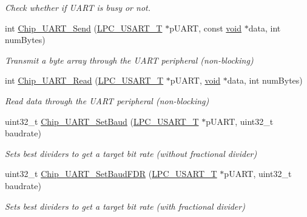 \begin{DoxyCompactItemize}
\begin{DoxyCompactList}\small\item\em Check whether if U\-A\-R\-T is busy or not. \end{DoxyCompactList}\item 
int \hyperlink{group__UART__17XX__40XX_gacbd726b1450510892272857e43854c4c}{Chip\-\_\-\-U\-A\-R\-T\-\_\-\-Send} (\hyperlink{structLPC__USART__T}{L\-P\-C\-\_\-\-U\-S\-A\-R\-T\-\_\-\-T} $\ast$p\-U\-A\-R\-T, const \hyperlink{Paradigm_2Tern__EE_2small_2portmacro_8h_a14d32f8130d3c0b212cfc751730b5b49}{void} $\ast$data, int num\-Bytes)
\begin{DoxyCompactList}\small\item\em Transmit a byte array through the U\-A\-R\-T peripheral (non-\/blocking) \end{DoxyCompactList}\item 
int \hyperlink{group__UART__17XX__40XX_ga06dd61ee7d8483847fea746978cb1c93}{Chip\-\_\-\-U\-A\-R\-T\-\_\-\-Read} (\hyperlink{structLPC__USART__T}{L\-P\-C\-\_\-\-U\-S\-A\-R\-T\-\_\-\-T} $\ast$p\-U\-A\-R\-T, \hyperlink{Paradigm_2Tern__EE_2small_2portmacro_8h_a14d32f8130d3c0b212cfc751730b5b49}{void} $\ast$data, int num\-Bytes)
\begin{DoxyCompactList}\small\item\em Read data through the U\-A\-R\-T peripheral (non-\/blocking) \end{DoxyCompactList}\item 
uint32\-\_\-t \hyperlink{group__UART__17XX__40XX_ga19f24dcf53316cbfb204003f506d5be5}{Chip\-\_\-\-U\-A\-R\-T\-\_\-\-Set\-Baud} (\hyperlink{structLPC__USART__T}{L\-P\-C\-\_\-\-U\-S\-A\-R\-T\-\_\-\-T} $\ast$p\-U\-A\-R\-T, uint32\-\_\-t baudrate)
\begin{DoxyCompactList}\small\item\em Sets best dividers to get a target bit rate (without fractional divider) \end{DoxyCompactList}\item 
uint32\-\_\-t \hyperlink{group__UART__17XX__40XX_gad22ce7fc8360c02aab39b2dd586088fd}{Chip\-\_\-\-U\-A\-R\-T\-\_\-\-Set\-Baud\-F\-D\-R} (\hyperlink{structLPC__USART__T}{L\-P\-C\-\_\-\-U\-S\-A\-R\-T\-\_\-\-T} $\ast$p\-U\-A\-R\-T, uint32\-\_\-t baudrate)
\begin{DoxyCompactList}\small\item\em Sets best dividers to get a target bit rate (with fractional divider) \end{DoxyCompactList}\item 

\end{DoxyCompactItemize}
